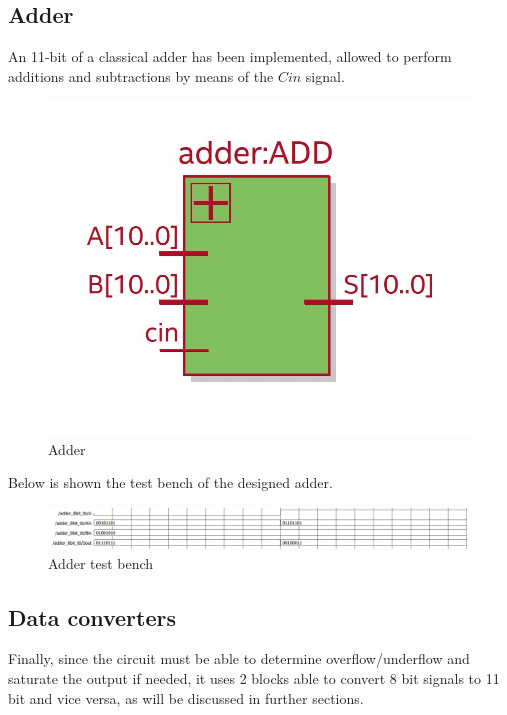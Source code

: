 \documentclass[12pt]{article}
\begin{document}
\newpage

\subsection*{Adder}

An 11-bit of a classical adder has been implemented, allowed to perform additions and subtractions by means of the  $Cin$ signal.
\begin{figure}[h!]
	\centering
	\includegraphics[scale = 0.65]{immagini/adder.jpg}
	\caption{Adder}
\end{figure}


Below is shown the test bench of the designed adder.


\begin{figure}[h]
	\centering
	\includegraphics[scale = 0.55]{immagini/adder_tb.png}
	\caption{Adder test bench}
\end{figure}

\subsection*{Data converters}

Finally, since the circuit must be able to determine overflow/underflow and saturate the output if needed, it uses 2 blocks able to convert 8 bit signals to 11 bit and vice versa, as will be discussed in further sections. 
\end{document}
